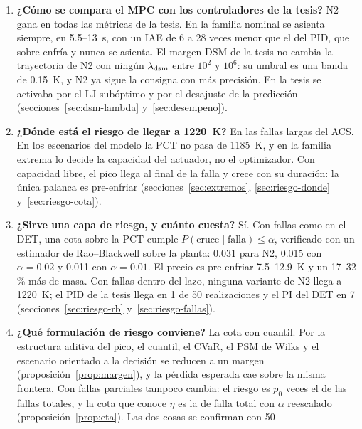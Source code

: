 \begin{enumerate}[label=\textbf{Q\arabic*.}]
        N2 tiene la misma garantía y N1 queda a menos del 1.3\,\%. Los 24 arranques de Ipopt
        convergen siempre al mismo plan. Las consultas con $J\approx0$ quedan certificadas por
        la cota trivial $J\ge0$ (sección~\ref{sec:f7}).
  \item \textbf{¿Cómo se compara el MPC con los controladores de la tesis?} N2 gana en todas
        las métricas de la tesis. En la familia nominal se asienta siempre, en 5.5--13~s, con
        un IAE de 6 a 28 veces menor que el del PID, que sobre-enfría y nunca se asienta. El
        margen DSM de la tesis no cambia la trayectoria de N2 con ningún
        $\lambda_{\rm dsm}$ entre $10^2$ y $10^6$: su umbral es una banda de 0.15~K, y N2 ya
        sigue la consigna con más precisión. En la tesis se activaba por el LJ subóptimo y por
        el desajuste de la predicción (secciones~\ref{sec:dsm-lambda} y~\ref{sec:desempeno}).
  \item \textbf{¿Dónde está el riesgo de llegar a 1220~K?} En las fallas largas del ACS. En los
        escenarios del modelo la PCT no pasa de 1185~K, y en la familia extrema lo decide la
        capacidad del actuador, no el optimizador. Con capacidad libre, el pico llega al final
        de la falla y crece con su duración: la única palanca es pre-enfriar
        (secciones~\ref{sec:extremos}, \ref{sec:riesgo-donde} y~\ref{sec:riesgo-cota}).
  \item \textbf{¿Sirve una capa de riesgo, y cuánto cuesta?} Sí. Con fallas como en el DET, una
        cota sobre la PCT cumple $P(\text{cruce}\mid\text{falla})\le\alpha$, verificado con un
        estimador de Rao--Blackwell sobre la planta: 0.031 para N2, 0.015 con $\alpha=0.02$ y
        0.011 con $\alpha=0.01$. El precio es pre-enfriar 7.5--12.9~K y un 17--32\,\% más de masa.
        Con fallas dentro del lazo, ninguna variante de N2 llega a 1220~K; el PID de la tesis
        llega en 1 de 50 realizaciones y el PI del DET en 7 (secciones~\ref{sec:riesgo-rb}
        y~\ref{sec:riesgo-fallas}).
  \item \textbf{¿Qué formulación de riesgo conviene?} La cota con cuantil. Por la estructura
        aditiva del pico, el cuantil, el CVaR, el PSM de Wilks y el escenario orientado a la
        decisión se reducen a un margen (proposición~\ref{prop:margen}), y la pérdida esperada
        cae sobre la misma frontera. Con fallas parciales tampoco cambia: el riesgo es $p_0$
        veces el de las fallas totales, y la cota que conoce $\eta$ es la de falla total con
        $\alpha$ reescalado (proposición~\ref{prop:eta}). Las dos cosas se confirman con 50

\end{enumerate}
